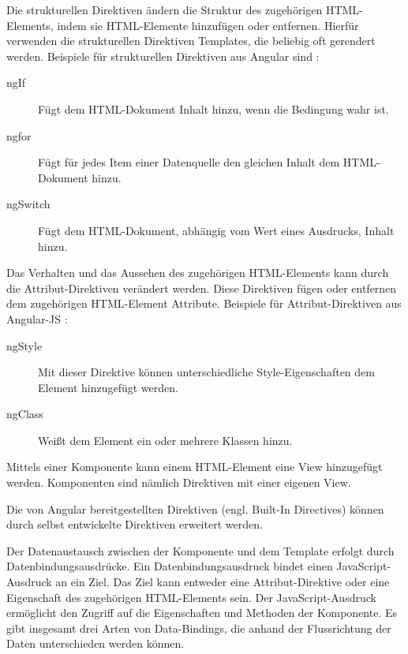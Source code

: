 Die strukturellen Direktiven ändern die Struktur des zugehörigen HTML-Elements, indem sie HTML-Elemente hinzufügen oder entfernen. Hierfür verwenden die strukturellen Direktiven Templates, die beliebig oft gerendert werden. \autocites[vgl.][269\psqq]{Steyer.2017}[vgl.][365]{Freeman.2018} Beispiele für strukturellen Direktiven aus Angular sind \autocite[vgl.][261\psqq]{Freeman.2018}:
\begin{description}
	\item [ngIf] Fügt dem HTML-Dokument Inhalt hinzu, wenn die Bedingung wahr ist. 
	\item [ngfor] Fügt für jedes Item einer Datenquelle den gleichen Inhalt dem HTML-Dokument hinzu.
	\item [ngSwitch] Fügt dem HTML-Dokument, abhängig vom Wert eines Ausdrucks, Inhalt hinzu.
\end{description} 

Das Verhalten und das Aussehen des zugehörigen HTML-Elements kann durch die Attribut-Direktiven verändert werden. Diese Direktiven fügen oder entfernen dem zugehörigen HTML-Element Attribute. \autocite[vgl.][339]{Freeman.2018} Beispiele für Attribut-Direktiven aus Angular-JS \autocite[vgl.][249\psqq]{Freeman.2018}:
\begin{description}
	\item [ngStyle] Mit dieser Direktive können unterschiedliche Style-Eigenschaften dem Element hinzugefügt werden.
	\item [ngClass] Weißt dem Element ein oder mehrere Klassen hinzu. 
\end{description}

Mittels einer Komponente kann einem HTML-Element eine View hinzugefügt werden. Komponenten sind nämlich Direktiven mit einer eigenen View. \autocites[vgl.][265]{Steyer.2017}

Die von Angular bereitgestellten Direktiven (engl. Built-In Directives) können durch selbst entwickelte Direktiven erweitert werden. \autocite[vgl.][261]{Freeman.2018}

Der Datenaustausch zwischen der Komponente und dem Template erfolgt durch Datenbindungsausdrücke. Ein Datenbindungsausdruck bindet einen JavaScript-Ausdruck an ein Ziel. Das Ziel kann entweder eine Attribut-Direktive oder eine Eigenschaft des zugehörigen HTML-Elements sein. Der JavaScript-Ausdruck ermöglicht den Zugriff auf die Eigenschaften und Methoden der Komponente. \autocites[vgl.][237\psqq]{Freeman.2018}[vgl.][52\psq]{Steyer.2017} [vgl.][]{Google.d} Es gibt insgesamt drei Arten von Data-Bindings, die anhand der Flussrichtung der Daten unterschieden werden können. 

